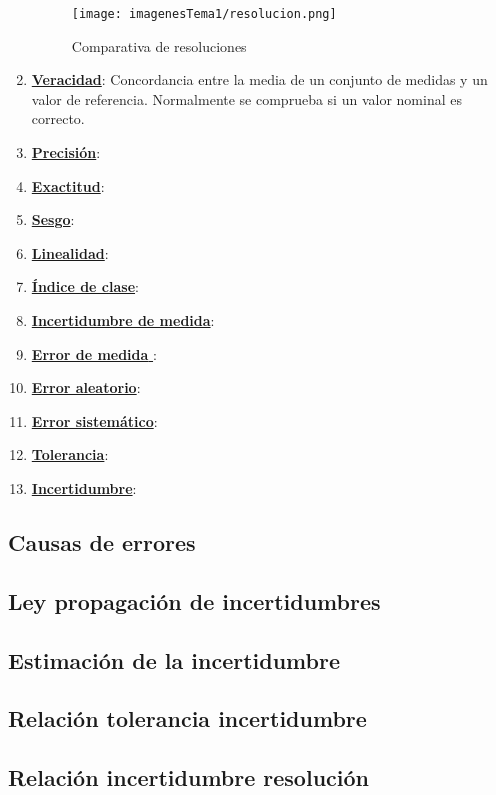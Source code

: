 \begin{enumerate}
	\begin{figure}[H]
		\centering
		\texttt{[image: imagenesTema1/resolucion.png]}  
		\caption{Comparativa de resoluciones}
		\label{fig:sample}
	\end{figure}
	
	
	\item \underline{\textbf{Veracidad}}: Concordancia entre la media de un conjunto de medidas y un valor de referencia. Normalmente se comprueba si un valor nominal es correcto.
	\item \underline{\textbf{Precisión}}:
	\item \underline{\textbf{Exactitud}}:
	\item \underline{\textbf{Sesgo}}:
	\item \underline{\textbf{Linealidad}}:
	\item \underline{\textbf{Índice de clase}}:
	\item \underline{\textbf{Incertidumbre de medida}}:
	\item \underline{\textbf{Error de medida }}:
	\item \underline{\textbf{Error aleatorio}}:
	\item \underline{\textbf{Error sistemático}}:
	\item \underline{\textbf{Tolerancia}}:
	\item \underline{\textbf{Incertidumbre}}:
\end{enumerate}
\subsection{Causas de errores}
\subsection{Ley propagación de incertidumbres}
\subsection{Estimación de la incertidumbre}
\subsection{Relación tolerancia incertidumbre}
\subsection{Relación incertidumbre resolución}

